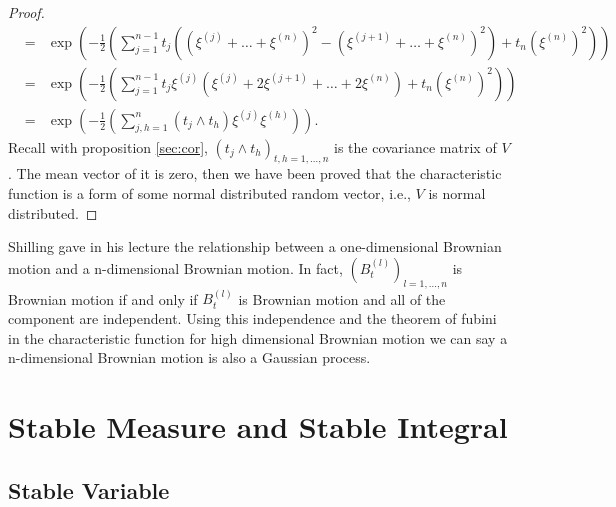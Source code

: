 \documentclass[a4paper, twoside, 11pt]{article}
\theoremstyle{definition}
\newtheorem{lemma}[definition]{\scshape Lemma}
\begin{document}
\begin{proof}
\begin{eqnarray*}
	&=& \exp\left(-\frac{1}{2}\left(\sum_{j=1}^{n-1} t_j((\xi^{(j)}+\dots+\xi^{(n)})^2 - (\xi^{(j+1)}+\dots+\xi^{(n)})^2) + t_n(\xi^{(n)})^2\right)\right)\\
	&=& \exp\left(-\frac{1}{2}\left(\sum_{j=1}^{n-1} t_j\xi^{(j)}(\xi^{(j)}+2\xi^{(j+1)}+\dots+2\xi^{(n)}) + t_n(\xi^{(n)})^2\right)\right)\\
	&=& \exp\left(-\frac{1}{2}\left(\sum_{j,h=1}^n(t_j\wedge t_h)\xi^{(j)}\xi^{(h)}\right)\right).
  \end{eqnarray*}
  Recall with proposition \ref{sec:cor}, $(t_j\wedge t_h)_{t,h=1,\dots,n}$ is the covariance matrix of $V$. The mean vector of it is zero, then we have been proved that the characteristic function is a form of some normal distributed random vector, i.e., $V$ is normal distributed.
\end{proof}

Shilling gave in his lecture \cite{shilling} the relationship between a one-dimensional Brownian motion and a n-dimensional Brownian motion.
In fact, $(B_t^{(l)})_{l=1,\dots,n}$ is Brownian motion if and only if $B_t^{(l)}$ is Brownian motion and all of the component are independent. Using this independence and the theorem of fubini in the characteristic function for high dimensional Brownian motion we can say a n-dimensional Brownian motion is also a Gaussian process.

\newpage

\section{Stable Measure and Stable Integral}
\subsection{Stable Variable}

\end{document}
